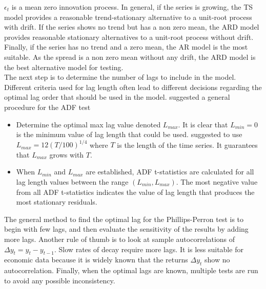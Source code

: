 \documentclass[11pt,a4,twosided,singlespacing,titlepagenumber=on]{scrreprt}
\numberwithin{equation}{chapter} %
\theoremstyle{remark}
\begin{document}
$\epsilon_t$ is a mean zero innovation process. In general, if the series is growing, the TS model provides a reasonable trend-stationary alternative to a unit-root process with drift. If the series shows no trend but has a non zero mean, the ARD model provides reasonable stationary alternatives to a unit-root process without drift. Finally, if the series has no trend and a zero mean, the AR model is the most suitable. As the spread is a non zero mean without any drift, the ARD model is the best alternative model for testing. \\

The next step is to determine the number of lags to include in the model. Different criteria used for lag length often lead to different decisions regarding the optimal lag order that should be used in the model. \cite{daoimpact} suggested a general procedure for the ADF test
\begin{itemize}
\item Determine the optimal max lag value denoted $L_{max}$. It is clear that $L_{min} = 0$ is the minimum value of lag length that could be used. \cite{schwert2002} suggested to use $L_{max} = 12 \left(T / 100 \right)^{1/4}$ where $T$ is the length of the time series. It guarantees that $L_{max}$ grows with $T$.
\item When $L_{min}$ and $L_{max}$ are established, ADF t-statistics are calculated for all lag length values between the range $(L_{min}, L_{max})$. The most negative value from all ADF t-statistics indicates the value of lag length that produces the most stationary residuals.
\end{itemize}
The general method to find the optimal lag for the Phillips-Perron test is to begin with few lags, and then evaluate the sensitivity of the results by adding more lags. Another rule of thumb is to look at sample autocorrelations of $\Delta y_t = y_t - y_{t-1}$. Slow rates of decay require more lags. It is less suitable for economic data because it is widely known that the returns $\Delta y_t$ show no autocorrelation. Finally, when the optimal lags are known, multiple tests are run to avoid any possible inconsistency.
\end{document}
